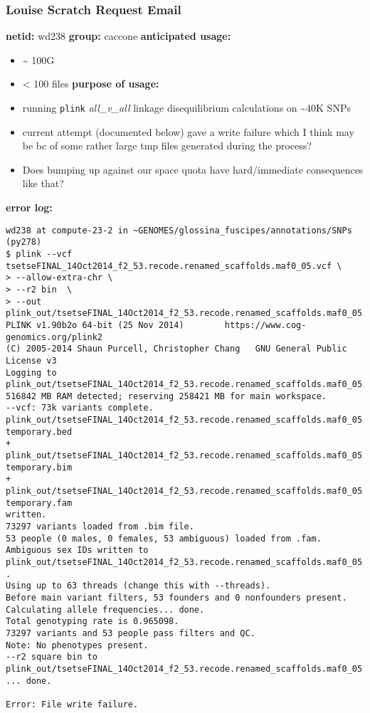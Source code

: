 \documentclass[letterpaper]{scrartcl}
\renewenvironment{quote}{\begin{blockquote}\list{}{\rightmargin=0em\leftmargin=0em}%
\item\relax\color{greytext}\ignorespaces}{\unskip\unskip\endlist\end{blockquote}}
\begin{document}
\subsubsection{Louise Scratch Request
Email}\label{louise-scratch-request-email}

\begin{quote}
\textbf{netid:} wd238 \textbf{group:} caccone \textbf{anticipated
usage:}

\begin{itemize}
\item
  \textasciitilde{} 100G
\item
  \textless{} 100 files \textbf{purpose of usage:}
\item
  running \texttt{plink} \emph{all\_v\_all} linkage disequilibrium
  calculations on \textasciitilde{}40K SNPs
\item
  current attempt (documented below) gave a write failure which I think
  may be bc of some rather large tmp files generated during the process?
\item
  Does bumping up against our space quota have hard/immediate
  consequences like that?
\end{itemize}

\textbf{error log:}

\begin{verbatim}
wd238 at compute-23-2 in ~GENOMES/glossina_fuscipes/annotations/SNPs (py278)
$ plink --vcf tsetseFINAL_14Oct2014_f2_53.recode.renamed_scaffolds.maf0_05.vcf \
> --allow-extra-chr \
> --r2 bin  \
> --out plink_out/tsetseFINAL_14Oct2014_f2_53.recode.renamed_scaffolds.maf0_05.vcf/ld/r2_bin
PLINK v1.90b2o 64-bit (25 Nov 2014)        https://www.cog-genomics.org/plink2
(C) 2005-2014 Shaun Purcell, Christopher Chang   GNU General Public License v3
Logging to plink_out/tsetseFINAL_14Oct2014_f2_53.recode.renamed_scaffolds.maf0_05.vcf/ld/r2_bin.log.
516842 MB RAM detected; reserving 258421 MB for main workspace.
--vcf: 73k variants complete.
plink_out/tsetseFINAL_14Oct2014_f2_53.recode.renamed_scaffolds.maf0_05.vcf/ld/r2_bin-temporary.bed
+
plink_out/tsetseFINAL_14Oct2014_f2_53.recode.renamed_scaffolds.maf0_05.vcf/ld/r2_bin-temporary.bim
+
plink_out/tsetseFINAL_14Oct2014_f2_53.recode.renamed_scaffolds.maf0_05.vcf/ld/r2_bin-temporary.fam
written.
73297 variants loaded from .bim file.
53 people (0 males, 0 females, 53 ambiguous) loaded from .fam.
Ambiguous sex IDs written to
plink_out/tsetseFINAL_14Oct2014_f2_53.recode.renamed_scaffolds.maf0_05.vcf/ld/r2_bin.nosex
.
Using up to 63 threads (change this with --threads).
Before main variant filters, 53 founders and 0 nonfounders present.
Calculating allele frequencies... done.
Total genotyping rate is 0.965098.
73297 variants and 53 people pass filters and QC.
Note: No phenotypes present.
--r2 square bin to
plink_out/tsetseFINAL_14Oct2014_f2_53.recode.renamed_scaffolds.maf0_05.vcf/ld/r2_bin.ld.bin
... done.

Error: File write failure.
\end{verbatim}
\end{quote}
\end{document}

